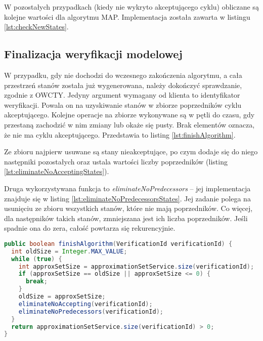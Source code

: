 W pozostałych przypadkach (kiedy nie wykryto akceptującego cyklu) obliczane są kolejne wartości dla algorytmu MAP. Implementacja została zawarta w listingu \ref{lst:checkNewStates}.


\subsection{Finalizacja weryfikacji modelowej}

W przypadku, gdy nie dochodzi do wczesnego zakończenia algorytmu, a cała przestrzeń stanów została już wygenerowana, należy dokończyć sprawdzanie, zgodnie z OWCTY.
Jedyny argument wymagany od klienta to identyfikator weryfikacji.
Powala on na uzyskiwanie stanów w zbiorze poprzedników cyklu akceptującego.
Kolejne operacje na zbiorze wykonywane są w pętli do czasu, gdy przestaną zachodzić w nim zmiany lub okaże się pusty.
Brak elementów oznacza, że nie ma cyklu akceptującego. 
Przedstawia to listing \ref{lst:finishAlgorithm}.

Ze zbioru najpierw usuwane są stany nieakceptujące, po czym dodaje się do niego następniki pozostałych oraz ustala wartości liczby poprzedników (listing \ref{lst:eliminateNoAcceptingStates}).

Druga wykorzystywana funkcja to \textit{eliminateNoPredecessors} -- jej implementacja znajduje się w listing \ref{lst:eliminateNoPredecessorsStates}.
Jej zadanie polega na usunięciu ze zbioru wszystkich stanów, które nie mają poprzedników.
Co więcej, dla następników takich stanów, zmniejszana jest ich liczba poprzedników.
Jeśli spadnie ona do zera, całość powtarza się rekurencyjnie.

\begin{minipage}{\linewidth}
\begin{lstlisting}[caption={Kod obsługujący algorytm w przypadku, gdy nie zakończy się wcześniej.},captionpos=b,label={lst:finishAlgorithm},language=Java]
public boolean finishAlgorithm(VerificationId verificationId) {
  int oldSize = Integer.MAX_VALUE;
  while (true) {
    int approxSetSize = approximationSetService.size(verificationId);
    if (approxSetSize == oldSize || approxSetSize <= 0) {
      break;
    }
    oldSize = approxSetSize;
    eliminateNoAccepting(verificationId);
    eliminateNoPredecessors(verificationId);
  }
  return approximationSetService.size(verificationId) > 0;
}
\end{lstlisting}
\end{minipage}

